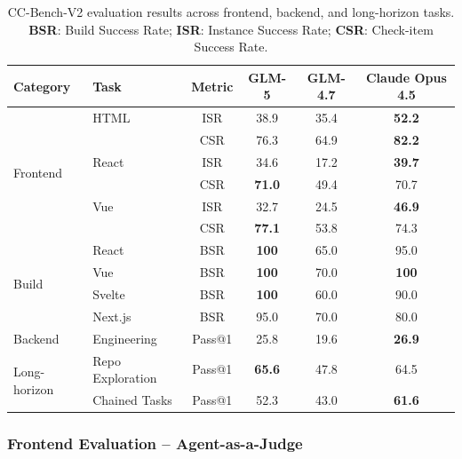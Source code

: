 \documentclass{article}
\theoremstyle{definition}
\begin{document}
\begin{table}[h!]
\centering
\caption{CC-Bench-V2 evaluation results across frontend, backend, and long-horizon tasks. \textbf{BSR}: Build Success Rate; \textbf{ISR}: Instance Success Rate; \textbf{CSR}: Check-item Success Rate.}
\label{tab:cc-bench-v2}
\begin{tabular}{llcccc}
\toprule
\textbf{Category} & \textbf{Task} & \textbf{Metric} & \textbf{GLM-5} & \textbf{GLM-4.7} & \textbf{Claude Opus 4.5} \\
\midrule
\multirow{6}{*}{Frontend}
  & HTML           & ISR     & 38.9          & 35.4          & \textbf{52.2} \\
  &                & CSR     & 76.3          & 64.9          & \textbf{82.2} \\[2pt]
  & React          & ISR     & 34.6          & 17.2          & \textbf{39.7} \\
  &                & CSR     & \textbf{71.0} & 49.4          & 70.7          \\[2pt]
  & Vue            & ISR     & 32.7          & 24.5          & \textbf{46.9} \\
  &                & CSR     & \textbf{77.1} & 53.8          & 74.3          \\
\midrule
\multirow{4}{*}{Build}
  & React          & BSR     & \textbf{100}  & 65.0          & 95.0          \\
  & Vue            & BSR     & \textbf{100}  & 70.0          & \textbf{100}  \\
  & Svelte         & BSR     & \textbf{100}  & 60.0          & 90.0          \\
  & Next.js        & BSR     & 95.0          & 70.0          & 80.0          \\
\midrule
Backend            & Engineering & Pass@1  & 25.8          & 19.6          & \textbf{26.9} \\
\midrule
\multirow{2}{*}{Long-horizon}
  & Repo Exploration   & Pass@1  & \textbf{65.6} & 47.8          & 64.5          \\
  & Chained Tasks      & Pass@1  & 52.3          & 43.0          & \textbf{61.6} \\
\bottomrule
\end{tabular}
\end{table}

\subsubsection{Frontend Evaluation -- Agent-as-a-Judge}
\end{document}
